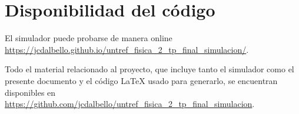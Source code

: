 \documentclass[12pt,a4paper]{article}
\begin{document}
\clearpage

\section*{Disponibilidad del código}
El simulador puede probarse de manera online \\ \url{https://jcdalbello.github.io/untref_fisica_2_tp_final_simulacion/}.

Todo el material relacionado al proyecto, que incluye tanto el simulador como el presente documento y el código \LaTeX{} usado para generarlo, se encuentran disponibles en \url{https://github.com/jcdalbello/untref_fisica_2_tp_final_simulacion}.

\printbibliography
\end{document}
